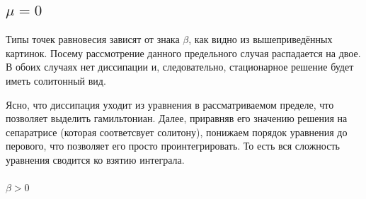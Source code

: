 \documentclass[titlepage]{article}
\begin{document}
\subsection{${\mu = 0}$}
Типы точек равновесия зависят от знака $\beta$, как видно из вышеприведённых картинок. Посему рассмотрение данного предельного случая распадается на двое. В обоих случаях нет диссипации и, следовательно, стационарное решение будет иметь солитонный вид. 
\par Ясно, что диссипация уходит из уравнения в рассматриваемом пределе, что позволяет выделить гамильтониан. Далее, приравняв его значению решения на сепаратрисе (которая соответсвует солитону), понижаем порядок уравнения до перового, что позволяет его просто проинтегрировать. То есть вся сложность уравнения сводится ко взятию интеграла.

\subparagraph{$\beta > 0$}
\end{document}

